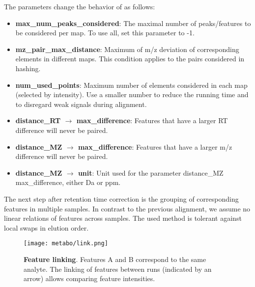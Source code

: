 \noindent The parameters change the behavior of  as follows:
\begin{itemize}
\item \textbf{max\_num\_peaks\_considered}: The maximal number of peaks/features to be considered per map. To use all, set this parameter to -1.
\item \textbf{mz\_pair\_max\_distance}: Maximum of m/z deviation of corresponding elements in different maps.  This condition applies to the pairs considered in hashing.
\item \textbf{num\_used\_points}: Maximum number of elements considered in each map (selected by intensity). Use a smaller number to reduce the running time and to disregard weak signals during alignment.
\item \textbf{distance\_RT $\rightarrow$ max\_difference}: Features that have a larger RT difference will never be paired.
\item \textbf{distance\_MZ $\rightarrow$ max\_difference}: Features that have a larger m/z difference will never be paired.
\item \textbf{distance\_MZ $\rightarrow$ unit}: Unit used for the parameter distance\_MZ max\_difference, either Da or ppm.
\end{itemize}

The next step after retention time correction is the grouping of corresponding features in multiple samples. In contrast to the previous alignment, we assume no linear relations of features across samples. The used method is tolerant against local swaps in elution order.

\begin{figure}[htb]
	\centering
	\texttt{[image: metabo/link.png]}
	\caption[Label-free quantification]
	{
	\textbf{Feature linking}. Features A and B correspond to the same analyte. The linking of features between runs (indicated by an arrow) allows comparing feature intensities.
	}
	\label{fig_bg_link}
\end{figure}

